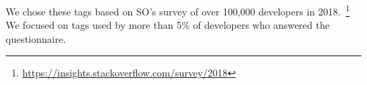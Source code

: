 \documentclass[conference]{IEEEtran}
\begin{document}
We chose these tags based on SO's survey of over 100,000 developers in 2018.~\footnote{\url{https://insights.stackoverflow.com/survey/2018}} We focused on tags used by more than 5\% of developers who answered the questionnaire. 



\end{document}

